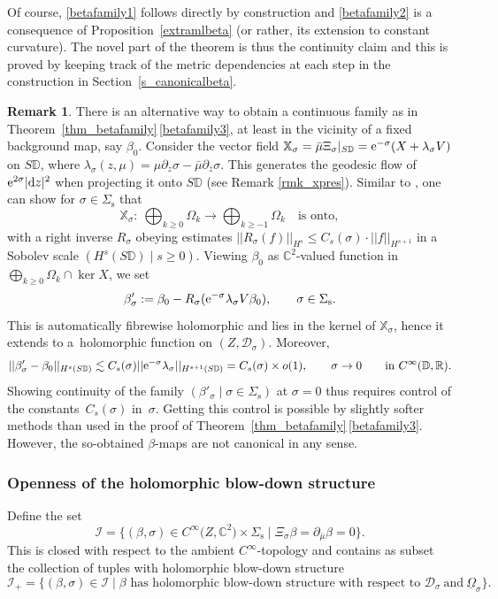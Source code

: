 \documentclass[10pt,a4paper]{amsart}
\numberwithin{equation}{section}
\theoremstyle{definition}
\newtheorem{Remark}[Theorem]{Remark}
\newcommand{\R}{\mathbb{R}} %
\newcommand{\C}{\mathbb{C}} %
\newcommand{\DD}{\mathbb{D}} %
\newcommand{\1}{{\bf 1}}
\newcommand{\Om}{{\underline{\Omega}}}
\newcommand{\D}{\mathscr{D}}
\begin{document}
Of course, \ref{betafamily1} follows directly by construction and \ref{betafamily2} is a consequence of Proposition~\ref{extramlbeta} (or rather, its extension to constant curvature). The novel part of the theorem is thus the continuity claim and this is proved by keeping track of the metric dependencies at each step in the construction in Section~\ref{s_canonicalbeta}.


\begin{Remark}
There is an alternative way to obtain a continuous family as in Theorem~\ref{thm_betafamily}\,\ref{betafamily3}, at least in the vicinity of a fixed background map, say $\beta_0$. Consider the vector field $\mathbb X_\sigma = \bar \mu \Xi_\sigma|_{S\DD}={\rm e}^{-\sigma}(X+\lambda_\sigma V)$ on $S\DD$, where $\lambda_\sigma(z,\mu)=\mu \partial_z\sigma - \bar\mu\partial_{\bar z}\sigma$. This generates the geodesic flow of ${\rm e}^{2\sigma}|{\rm d}z|^2$ when projecting it onto $S\DD$ (see Remark \ref{rmk_xpres}). Similar to \cite[Proposition~3.1]{BoPa23}, one can show for $\sigma\in \Sigma_\mathrm{s}$ that
\[
	\mathbb X_\sigma\colon\ \bigoplus_{k\ge 0}\Omega_k\rightarrow \bigoplus_{k\ge -1}\Omega_k\quad \text{is onto},
\]	
with a right inverse $R_\sigma$ obeying estimates $||R_\sigma(f)||_{H^{s}} \le C_s(\sigma)\cdot || f||_{H^{s+1}}$ in a Sobolev scale $(H^s(S\DD)\mid s\ge 0)$. Viewing $\beta_0$ as $\C^2$-valued function in $\bigoplus_{k\ge 0}\Omega_k\cap \ker X$, we set
\[
	\beta'_\sigma : = \beta_0 - R_\sigma({\rm e}^{-\sigma}\lambda_\sigma V\beta_0),\qquad \sigma\in \Sigma_\mathrm{s}.
\]
This is automatically fibrewise holomorphic and lies in the kernel of $\mathbb X_\sigma$, hence it extends to a~holomorphic function on $(Z,\D_\sigma)$. Moreover,
\[
	||\beta_\sigma' - \beta_0 ||_{H^s(S\DD)} \lesssim C_s(\sigma) ||{\rm e}^{-\sigma}\lambda_\sigma||_{H^{s+1}(S\DD)} = C_s(\sigma) \times o(1),\qquad \sigma\rightarrow 0 \qquad \text{in}\  C^\infty(\DD,\R).
\]
Showing continuity of the family $(\beta'_\sigma\mid \sigma\in \Sigma_\mathrm{s})$ at $\sigma=0$ thus requires control of the constants~$C_s(\sigma)$ in~$\sigma$. Getting this control is possible by slightly softer methods than used in the proof of Theorem~\ref{thm_betafamily}\,\ref{betafamily3}. However, the so-obtained $\beta$-maps are not canonical in any sense.





\end{Remark}


\subsubsection{Openness of the holomorphic blow-down structure} \label{s_openness}
Define the set
\[
	\mathcal I = \big\{(\beta,\sigma)\in C^\infty\bigl(Z,\C^2\bigr) \times \Sigma_\mathrm{s} \mid \Xi_\sigma \beta = \partial_{\bar \mu} \beta =0 \big\}.
\]
This is closed with respect to the ambient $C^\infty$-topology and contains as subset the collection of tuples with holomorphic blow-down structure
\[
	\mathcal I_+=\{(\beta,\sigma)\in \mathcal I \mid \text{$\beta$ has holomorphic blow-down structure with respect to~} \D_\sigma~\text{and}~\Om_\sigma\}.
\]
\end{document}
